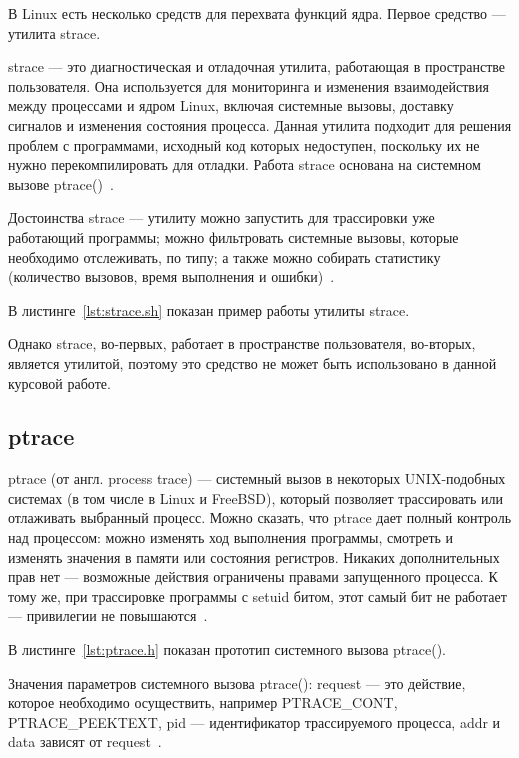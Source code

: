 \documentclass{bmstu}
\begin{document}
В Linux есть несколько средств для перехвата функций ядра. 
Первое средство --- утилита strace.

strace --- это диагностическая и отладочная утилита, работающая в пространстве пользователя. 
Она используется для мониторинга и изменения взаимодействия между процессами и ядром Linux, включая системные вызовы, доставку сигналов и изменения состояния процесса. 
Данная утилита подходит для решения проблем с программами, исходный код которых недоступен, поскольку их не нужно перекомпилировать для отладки. 
Работа strace основана на системном вызове ptrace()~\cite{Strace}.

Достоинства strace --- утилиту можно запустить для трассировки уже работающий программы; можно фильтровать системные вызовы, которые необходимо отслеживать, по типу; а также можно собирать статистику (количество вызовов, время выполнения и ошибки)~\cite{Strace}.

В листинге~\ref{lst:strace.sh} показан пример работы утилиты strace.


Однако strace, во-первых, работает в пространстве пользователя, во-вторых, является утилитой, поэтому это средство не может быть использовано в данной курсовой работе.

\subsection{ptrace}

ptrace (от англ. process trace) --- системный вызов в некоторых UNIX-подобных системах (в том числе в Linux и FreeBSD), который позволяет трассировать или отлаживать выбранный процесс. 
Можно сказать, что ptrace дает полный контроль над процессом: можно изменять ход выполнения программы, смотреть и изменять значения в памяти или состояния регистров. 
Никаких дополнительных прав нет --- возможные действия ограничены правами запущенного процесса. 
К тому же, при трассировке программы с setuid битом, этот самый бит не работает --- привилегии не повышаются~\cite{Ptrace}.

В листинге~\ref{lst:ptrace.h} показан прототип системного вызова ptrace().


Значения параметров системного вызова ptrace(): request --- это действие, которое необходимо осуществить, например PTRACE\_CONT, PTRACE\_PEEKTEXT, pid --- идентификатор трассируемого процесса, addr и data зависят от request~\cite{Ptrace}.
\end{document}
